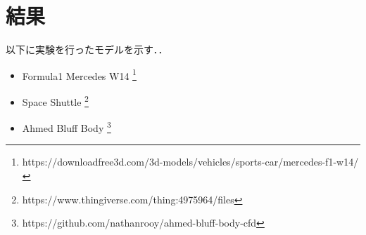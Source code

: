 \documentclass[main]{subfiles}
\begin{document}
\chapter{結果}

以下に実験を行ったモデルを示す．．

\begin{itemize}
    \item Formula1 Mercedes W14 \footnote{https://downloadfree3d.com/3d-models/vehicles/sports-car/mercedes-f1-w14/}
    \item Space Shuttle \footnote{https://www.thingiverse.com/thing:4975964/files}
    \item Ahmed Bluff Body \footnote{https://github.com/nathanrooy/ahmed-bluff-body-cfd}
\end{itemize}
\end{document}
